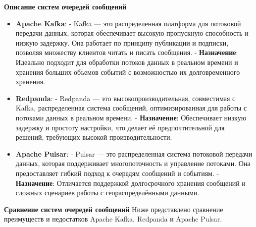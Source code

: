 \textbf{Описание систем очередей сообщений}
\begin{itemize}
    \item \textbf{Apache Kafka}:
            - Kafka — это распределенная платформа для потоковой передачи данных, которая обеспечивает высокую пропускную способность и низкую задержку. Она работает по принципу публикации и подписки, позволяя множеству клиентов читать и писать сообщения.
            - \textbf{Назначение}: Идеально подходит для обработки потоков данных в реальном времени и хранения больших объемов событий с возможностью их долговременного хранения.
    \item \textbf{Redpanda}:
            - Redpanda — это высокопроизводительная, совместимая с Kafka, распределенная система сообщений, оптимизированная для работы с потоками данных в реальном времени.
            - \textbf{Назначение}: Обеспечивает низкую задержку и простоту настройки, что делает её предпочтительной для решений, требующих высокой производительности. 

    \item \textbf{Apache Pulsar}:
            - Pulsar — это распределенная система потоковой передачи данных, которая поддерживает многопоточность и управление потоками. Она предоставляет гибкий подход к очередям сообщений и событиям.
            - \textbf{Назначение}: Отличается поддержкой долгосрочного хранения сообщений и сложных сценариев работы с геораспределёнными данными.
\end{itemize}



\textbf{Сравнение систем очередей сообщений}
Ниже представлено сравнение преимуществ и недостатков Apache Kafka, Redpanda и Apache Pulsar.

